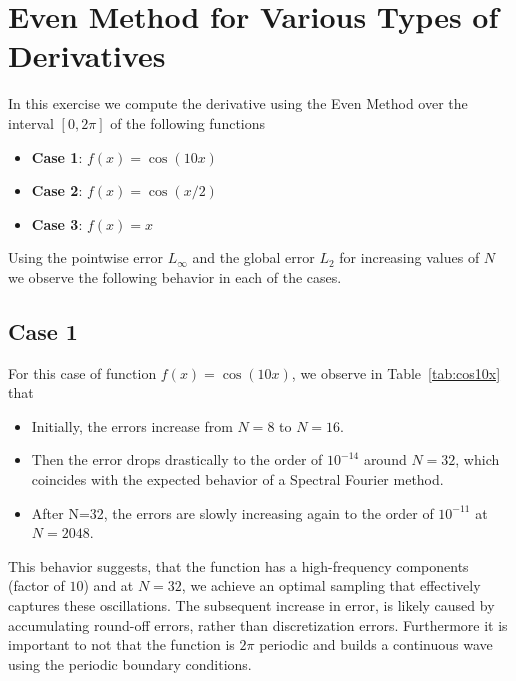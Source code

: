 \section{Even Method for Various Types of Derivatives}
In this exercise we compute the derivative using the Even Method over the interval $[0, 2 \pi]$ of the following functions
\begin{itemize}
	\item \textbf{Case 1}: $f(x) = \cos(10x)$
	\item \textbf{Case 2}: $f(x) = \cos(x/2)$
	\item \textbf{Case 3}: $f(x) = x$
\end{itemize}
Using the pointwise error $L_\infty$ and the global error $L_2$ for increasing values of $N$ we observe the following behavior in each of the cases.
\subsection{Case 1}
%
%
For this case of function $f(x)=\cos(10x)$, we observe in Table~\ref{tab:cos10x} that
\begin{itemize}
	\item Initially, the errors increase from $N=8$ to $N=16$.
	\item Then the error drops drastically to the order of $10^{-14}$ around $N=32$, which coincides with the expected behavior of a Spectral Fourier method.
	\item After N=32, the errors are slowly increasing again to the order of $10^{-11}$ at $N=2048$.
\end{itemize}
This behavior suggests, that the function has a high-frequency components (factor of $10$) and at $N=32$, we achieve an optimal sampling that effectively captures these oscillations. The subsequent increase in error, is likely caused by accumulating round-off errors, rather than discretization errors. Furthermore it is important to not that the function is $2\pi$ periodic and builds a continuous wave using the periodic boundary conditions.
